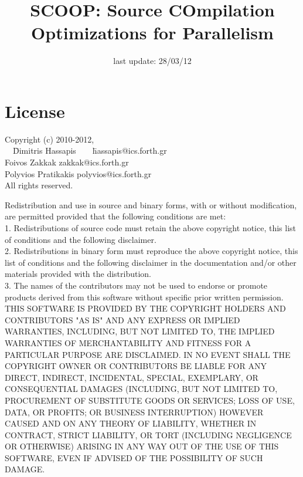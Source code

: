 \documentclass[a4paper]{article}
\begin{document}
\title{SCOOP: Source COmpilation Optimizations for Parallelism \scoopversion}
\date{last update: 28/03/12}
\maketitle

\section{License}

\begin{tabbing}
Copyright (c) 2010-2012,\\
\ \ \=Dimitris Hassapis\ \ \ \ \=hassapis@ics.forth.gr\\
\>Foivos Zakkak        \>zakkak@ics.forth.gr\\
\>Polyvios Pratikakis  \>polyvios@ics.forth.gr\\
All rights reserved.
\end{tabbing}

Redistribution and use in source and binary forms, with or without
modification, are permitted provided that the following conditions are
met:\\

1. Redistributions of source code must retain the above copyright
notice, this list of conditions and the following disclaimer.\\

2. Redistributions in binary form must reproduce the above copyright
notice, this list of conditions and the following disclaimer in the
documentation and/or other materials provided with the distribution.\\

3. The names of the contributors may not be used to endorse or promote
products derived from this software without specific prior written
permission.\\

THIS SOFTWARE IS PROVIDED BY THE COPYRIGHT HOLDERS AND CONTRIBUTORS "AS
IS" AND ANY EXPRESS OR IMPLIED WARRANTIES, INCLUDING, BUT NOT LIMITED
TO, THE IMPLIED WARRANTIES OF MERCHANTABILITY AND FITNESS FOR A
PARTICULAR PURPOSE ARE DISCLAIMED. IN NO EVENT SHALL THE COPYRIGHT OWNER
OR CONTRIBUTORS BE LIABLE FOR ANY DIRECT, INDIRECT, INCIDENTAL, SPECIAL,
EXEMPLARY, OR CONSEQUENTIAL DAMAGES (INCLUDING, BUT NOT LIMITED TO,
PROCUREMENT OF SUBSTITUTE GOODS OR SERVICES; LOSS OF USE, DATA, OR
PROFITS; OR BUSINESS INTERRUPTION) HOWEVER CAUSED AND ON ANY THEORY OF
LIABILITY, WHETHER IN CONTRACT, STRICT LIABILITY, OR TORT (INCLUDING
NEGLIGENCE OR OTHERWISE) ARISING IN ANY WAY OUT OF THE USE OF THIS
SOFTWARE, EVEN IF ADVISED OF THE POSSIBILITY OF SUCH DAMAGE.\\
\end{document}
